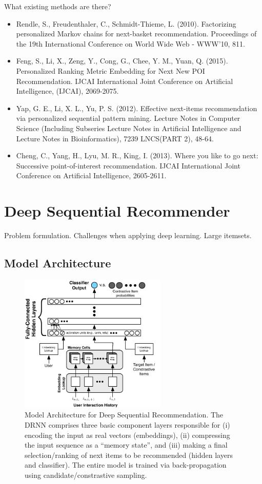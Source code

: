 \documentclass{sig-alternate-05-2015}
\begin{document}
What existing methods are there?
\begin{itemize}
\item Rendle, S., Freudenthaler, C., Schmidt-Thieme, L. (2010). Factorizing personalized Markov chains for next-basket recommendation. Proceedings of the 19th International Conference on World Wide Web - WWW'10, 811.
\item Feng, S., Li, X., Zeng, Y., Cong, G., Chee, Y. M., Yuan, Q. (2015). Personalized Ranking Metric Embedding for Next New POI Recommendation. IJCAI International Joint Conference on Artificial Intelligence, (IJCAI), 2069-2075.
\item Yap, G. E., Li, X. L., Yu, P. S. (2012). Effective next-items recommendation via personalized sequential pattern mining. Lecture Notes in Computer Science (Including Subseries Lecture Notes in Artificial Intelligence and Lecture Notes in Bioinformatics), 7239 LNCS(PART 2), 48-64.
\item Cheng, C., Yang, H., Lyu, M. R., King, I. (2013). Where you like to go next: Successive point-of-interest recommendation. IJCAI International Joint Conference on Artificial Intelligence, 2605-2611.
\end{itemize}
 
\section{Deep Sequential Recommender}

Problem formulation. Challenges when applying deep learning. Large itemsets. 

\subsection{Model Architecture}

\begin{figure}
\centering
	\includegraphics[width=7cm]{images/ModelArch}
	\caption{Model Architecture for Deep Sequential Recommendation. The DRNN comprises three basic component layers responsible for (i) encoding the input as real vectors (embeddings), (ii) compressing the input sequence as a ``memory state'', and (iii) making a final selection/ranking of next items to be recommended (hidden layers and classifier). The entire model is trained via back-propagation using candidate/constrastive sampling.}
	\label{fig:ModelArch}
\end{figure}
\end{document}
